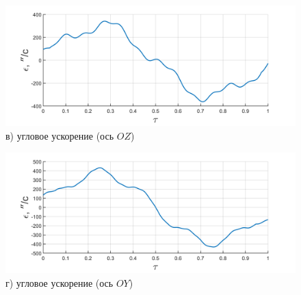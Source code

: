 \begin{figure}[h!]
	\begin{minipage}[b]{0.49\linewidth}\centering
		\includegraphics[width=\linewidth]{matlab/img/oz-gyro-sin-acc} \\ в) угловое ускорение (ось $OZ$)
	\end{minipage}
	\hfill
	\begin{minipage}[b]{0.49\linewidth}\centering
		\includegraphics[width=\linewidth]{matlab/img/oy-gyro-sin-acc} \\ г)  угловое ускорение (ось $OY$)
	\end{minipage}
	
	\vspace{0.5em} %
	

\end{figure}

